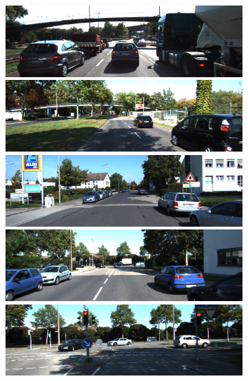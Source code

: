 \begin{figure}[htb]
  \centering
  \begin{subfigure}{0.15\linewidth}
  \begin{minipage}[b]{1\linewidth}
  \includegraphics[width=1\linewidth]{figure/kitti_rgb/0000000000.png}\vspace{4pt}
  \includegraphics[width=1\linewidth]{figure/kitti_rgb/0000000035.png}\vspace{4pt}
  \includegraphics[width=1\linewidth]{figure/kitti_rgb/0000000260.png}\vspace{4pt}
  \includegraphics[width=1\linewidth]{figure/kitti_rgb/0000000340.png}\vspace{4pt}
  \includegraphics[width=1\linewidth]{figure/kitti_rgb/0000000388.png}\vspace{4pt}

\end{minipage}
\end{subfigure}
\end{figure}
